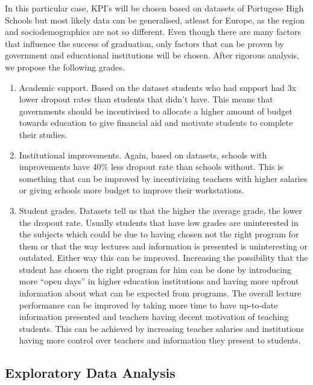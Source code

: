 \documentclass[
  letterpaper,
  DIV=11,
  numbers=noendperiod]{scrartcl}
\begin{document}
In this particular case, KPI's will be chosen based on datasets of
Portugese High Schools but most likely data can be generalised, atleast
for Europe, as the region and sociodemographics are not so different.
Even though there are many factors that influence the success of
graduation, only factors that can be proven by government and
educational institutions will be chosen. After rigorous analysis, we
propose the following grades.

\begin{enumerate}
\def\labelenumi{\arabic{enumi}.}
\item
  Academic support. Based on the dataset students who had support had 3x
  lower dropout rates than students that didn't have. This means that
  governments should be incentivised to allocate a higher amount of
  budget towards education to give financial aid and motivate students
  to complete their studies.
\item
  Institutional improvements. Again, based on datasets, schools with
  improvements have 40\% less dropout rate than schools without. This is
  something that can be improved by incentivizing teachers with higher
  salaries or giving schools more budget to improve their workstations.
\item
  Student grades. Datasets tell us that the higher the average grade,
  the lower the dropout rate. Usually students that have low grades are
  uninterested in the subjects which could be due to having chosen not
  the right program for them or that the way lectures and information is
  presented is uninteresting or outdated. Either way this can be
  improved. Increasing the possibility that the student has chosen the
  right program for him can be done by introducing more \enquote{open
  days} in higher education institutions and having more upfront
  information about what can be expected from programs. The overall
  lecture performance can be improved by taking more time to have
  up-to-date information presented and teachers having decent motivation
  of teaching students. This can be achieved by increasing teacher
  salaries and institutions having more control over teachers and
  information they present to students.
\end{enumerate}

\hypertarget{exploratory-data-analysis}{%
\subsection{Exploratory Data Analysis}\label{exploratory-data-analysis}}
\end{document}
